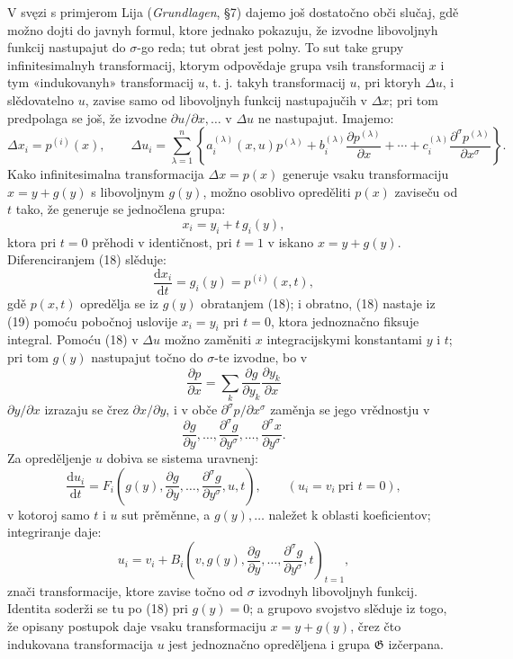 \documentclass[11pt]{article}
\providecommand{\G}{\mathfrak G}
\providecommand{\D}{\Delta}
\providecommand{\p}{\partial}
\providecommand{\dd}{\mathrm d}
\begin{document}
V svęzi s primjerom Lija (\emph{Grundlagen}, \S{}7) dajemo još dostatočno obči slučaj, gdě možno dojti do javnyh formul, ktore jednako pokazuju, že izvodne libovoljnyh funkcij nastupajut do \(\sigma\)-go reda; tut obrat jest polny. To sut take grupy infinitesimalnyh transformacij, ktorym odpovědaje grupa vsih transformacij \(x\) i tym «indukovanyh» transformacij \(u\), t. j. takyh transformacij \(u\), pri ktoryh \(\D u\), i slědovatelno \(u\), zavise samo od libovoljnyh funkcij nastupajučih v \(\D x\); pri tom predpolaga se još, že izvodne \(\p u/\p x,\ldots\) v \(\D u\) ne nastupajut. Imajemo:
\[
\D x_i=p^{(i)}(x),\qquad
\D u_i=
\sum_{\lambda=1}^{n}\left\{
a_i^{(\lambda)}(x,u)p^{(\lambda)}
+b_i^{(\lambda)}\frac{\p p^{(\lambda)}}{\p x}
+\cdots+
c_i^{(\lambda)}\frac{\p^\sigma p^{(\lambda)}}{\p x^\sigma}
\right\}.
\]
Kako infinitesimalna transformacija \(\D x=p(x)\) generuje vsaku transformaciju \(x=y+g(y)\) s libovoljnym \(g(y)\), možno osoblivo opreděliti \(p(x)\) zaviseču od \(t\) tako, že generuje se jednočlena grupa:
\begin{equation}
x_i=y_i+t\,g_i(y),
\tag{18}
\end{equation}
ktora pri \(t=0\) prěhodi v identičnost, pri \(t=1\) v iskano \(x=y+g(y)\). Diferenciranjem (18) slěduje:
\begin{equation}
\frac{\dd x_i}{\dd t}=g_i(y)=p^{(i)}(x,t),
\tag{19}
\end{equation}
gdě \(p(x,t)\) opredělja se iz \(g(y)\) obratanjem (18); i obratno, (18) nastaje iz (19) pomoću pobočnoj uslovije \(x_i=y_i\) pri \(t=0\), ktora jednoznačno fiksuje integral. Pomoću (18) v \(\D u\) možno zaměniti \(x\) integracijskymi konstantami \(y\) i \(t\); pri tom \(g(y)\) nastupajut točno do \(\sigma\)-te izvodne, bo v
\[
\frac{\p p}{\p x}=\sum_k\frac{\p g}{\p y_k}\frac{\p y_k}{\p x}
\]
\(\p y/\p x\) izrazaju se črez \(\p x/\p y\), i v obče \(\p^\sigma p/\p x^\sigma\) zaměnja se jego vrědnostju v
\[
\frac{\p g}{\p y},\ldots,\frac{\p^\sigma g}{\p y^\sigma},\ldots,\frac{\p^\sigma x}{\p y^\sigma}.
\]
Za opreděljenje \(u\) dobiva se sistema uravnenj:
\[
\frac{\dd u_i}{\dd t}
=
F_i\!\left(g(y),\frac{\p g}{\p y},\ldots,\frac{\p^\sigma g}{\p y^\sigma},u,t\right),
\qquad (u_i=v_i\ \text{pri }t=0),
\]
v kotoroj samo \(t\) i \(u\) sut prěměnne, a \(g(y),\ldots\) naležet k oblasti koeficientov; integriranje daje:
\[
u_i=v_i+
B_i\!\left(v,g(y),\frac{\p g}{\p y},\ldots,\frac{\p^\sigma g}{\p y^\sigma},t\right)_{t=1},
\]
znači transformacije, ktore zavise točno od \(\sigma\) izvodnyh libovoljnyh funkcij. Identita soderži se tu po (18) pri \(g(y)=0\); a grupovo svojstvo slěduje iz togo, že opisany postupok daje vsaku transformaciju \(x=y+g(y)\), črez čto indukovana transformacija \(u\) jest jednoznačno opreděljena i grupa \(\G\) izčerpana.
\end{document}
